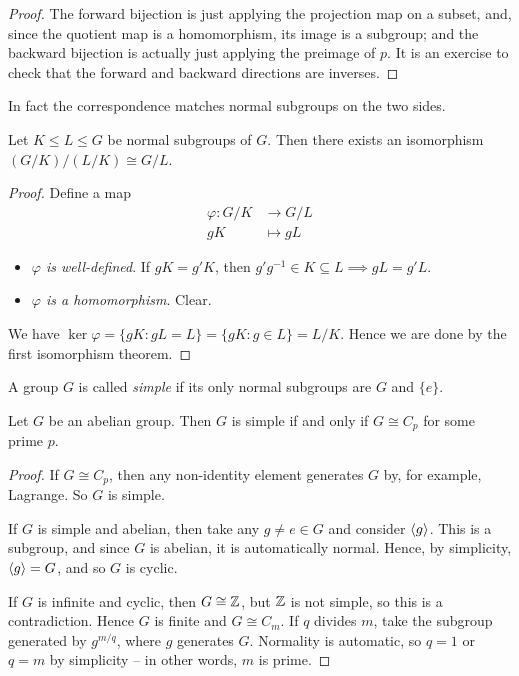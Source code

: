 \documentclass{../template/note}
\begin{document}
    \begin{proof}
        The forward bijection is just applying the projection map on a subset, and, since the quotient map is a homomorphism, its image is a subgroup; and the backward bijection is actually just applying the preimage of $p$. It is an exercise to check that the forward and backward directions are inverses.
    \end{proof}

    \begin{remark*}
        In fact the correspondence matches normal subgroups on the two sides.
    \end{remark*}
    
    \begin{theorem}
        Let $K \leq L \leq G$ be normal subgroups of $G$. Then there exists an isomorphism $(G/K)/(L/K) \cong G/L$.
    \end{theorem}
    
    \begin{proof}
        Define a map
        \begin{align*}
            \varphi: G/K &\to G/L \\
            gK &\mapsto gL
        \end{align*}
        \begin{itemize}
            \item \emph{$\varphi$ is well-defined}. If $gK = g'K$, then $g'g^{-1} \in K \subseteq L \implies gL = g'L$.
            \item \emph{$\varphi$ is a homomorphism}. Clear.
        \end{itemize}
        We have $\ker \varphi = \{gK: gL = L\} = \{gK: g \in L\} = L/K$. Hence we are done by the first isomorphism theorem.
    \end{proof}
    
    \begin{definition}[Simplicity]
        A group $G$ is called \emph{simple} if its only normal subgroups are $G$ and $\{e\}$.
    \end{definition}
    
    \begin{proposition}
        Let $G$ be an abelian group. Then $G$ is simple if and only if $G \cong C_p$ for some prime $p$.
    \end{proposition}
    
    \begin{proof}
        If $G \cong C_p$, then any non-identity element generates $G$ by, for example, Lagrange. So $G$ is simple.

        If $G$ is simple and abelian, then take any $g \neq e \in G$ and consider $\left \langle g \right \rangle$. This is a subgroup, and since $G$ is abelian, it is automatically normal. Hence, by simplicity, $\left \langle g \right \rangle = G$, and so $G$ is cyclic.

        If $G$ is infinite and cyclic, then $G \cong \mathbb Z$, but $\mathbb Z$ is not simple, so this is a contradiction. Hence $G$ is finite and $G \cong C_m$. If $q$ divides $m$, take the subgroup generated by $g^{m/q}$, where $g$ generates $G$. Normality is automatic, so $q=1$ or $q=m$ by simplicity -- in other words, $m$ is prime.
    \end{proof}
    
\end{document}
